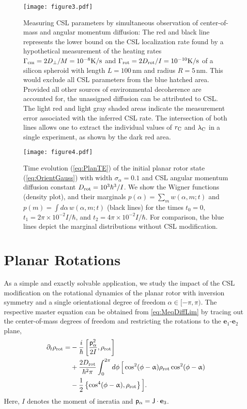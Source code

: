\documentclass[%
 twocolumn,
 amsmath,amssymb,
 aps,
 pra,
]{revtex4-1}
\newcommand{\op}[1]{{\sf #1}}
\begin{document}
\begin{figure}
  \centering
     \texttt{[image: figure3.pdf]}
  \caption{Measuring CSL parameters by simultaneous observation of center-of-mass and angular momentum diffusion: The red and black line represents the lower bound on the CSL localization rate found by a hypothetical measurement of the heating rates $\Gamma_{\rm cm}=   2 D_\perp/M = 10^{-8} {\rm K/s}$ and $\Gamma_{\rm rot}=  2D_{\rm rot}/I = 10^{-10} {\rm K/s}$ of a silicon spheroid with length $L = 100$\,nm and radius $R = 5$\,nm. This would exclude all CSL parameters from the blue hatched area. Provided all other sources of environmental decoherence are accounted for, the unassigned diffusion can be attributed to CSL.  The light red and light gray shaded areas indicate the measurement error associated with the inferred CSL rate.  The intersection of both lines allows one to extract the individual values of  $r_{\rm C}$ and $\lambda_{\rm C}$ in a single experiment, as shown by the dark 
red area. }
\label{CSLParameter}
\end{figure} 

\begin{figure*}
  \centering
  \texttt{[image: figure4.pdf]}
  \caption{Time evolution (\ref{eq:PlanTE}) of the initial planar rotor state (\ref{eq:OrientGauss}) with width $\sigma_\alpha=0.1$ and CSL angular momentum diffusion constant $D_{\rm rot}=10^3\hbar^3/I$. We show the Wigner functions (density plot), and their marginals $p(\alpha)=\sum_m w(\alpha,m;t)$ and $p(m)=\int d\alpha\, w(\alpha,m;t)$  (black lines) for the times $t_0=0,$ $ t_1=2\pi\times 10^{-2} I/\hbar$, and $ t_2=4\pi\times 10^{-2} I/\hbar$. For comparison, the blue lines depict the marginal distributions without CSL modification.}
\label{fig:PlanarTE}
\end{figure*}

\section{Planar Rotations} 

As a simple and exactly solvable application, we study the impact of the CSL modification on the rotational dynamics of the planar rotor with inversion symmetry and a single orientational degree of freedom $\alpha \in [-\pi,\pi)$. The respective master equation can be obtained from \eqref{eq:MeqDiffLim} by tracing out the center-of-mass degrees of freedom and restricting the rotations to the $\textbf{e}_1$-$\textbf{e}_2$ plane,
\begin{align} \label{eq:planrot}
\partial_t\rho_{\rm rot}=&-\frac{i}{\hbar}\left[\frac{\op{p}_{\alpha}^2}{2I},\rho_{\rm rot}\right]\nonumber\\
&+\frac{2D_{\rm rot}}{\hbar^2\pi}\int_0^{2 \pi} d\phi\,\Big[
\cos^2(\phi-\upalpha)\rho_{\rm rot}\cos^2(\phi-\upalpha)\nonumber\\
&-\frac{1}{2}\left\{\cos^4(\phi-\upalpha),\rho_{\rm rot}\right\}
\Big].
\end{align}
Here, $I$ denotes the moment of ineratia and $\op{p}_\alpha=\op{J}\cdot\textbf{e}_3$.
\end{document}

